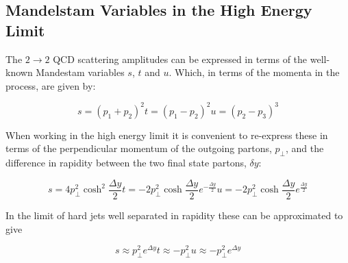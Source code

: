	\subsection{Mandelstam Variables in the High Energy Limit}
	\label{sub:Mandelstam Variables in the High Energy Limit}

		The $2\rightarrow 2$ QCD scattering amplitudes can be expressed in terms of the well-known Mandestam variables $s$, $t$ and $u$.  Which, in terms of the momenta in the process, are given by:

		\begin{subequations}
			\begin{equation}
				s = (p_1 + p_2)^2
			\end{equation}
			\begin{equation}
				t = (p_1 - p_2)^2
			\end{equation}
			\begin{equation}
				u = (p_2 - p_3)^3
			\end{equation}
		\end{subequations}

		When working in the high energy limit it is convenient to re-express these in terms of the perpendicular momentum of the outgoing partons, $p_\perp$, and the difference in rapidity between the two final state partons, $\delta y$:

		\begin{subequations}
			\begin{equation}
				s = 4p_\perp^2 \cosh^2\frac{\Delta y}{2}
			\end{equation}
			\begin{equation}
				t = -2p_\perp^2 \cosh\frac{\Delta y}{2}e^{-\frac{\Delta y}{2}}
			\end{equation}
			\begin{equation}
				u = -2p_\perp^2 \cosh\frac{\Delta y}{2}e^{\frac{\Delta y}{2}}
			\end{equation}
		\end{subequations}

		In the limit of hard jets well separated in rapidity these can be approximated to give

		\begin{subequations}
			\begin{equation}
				s \approx p_\perp^2 e^{\Delta y}
			\end{equation}
			\begin{equation}
				t \approx -p_\perp^2
			\end{equation}
			\begin{equation}
				u \approx -p_\perp^2 e^{\Delta y}
			\end{equation}
		\end{subequations}

